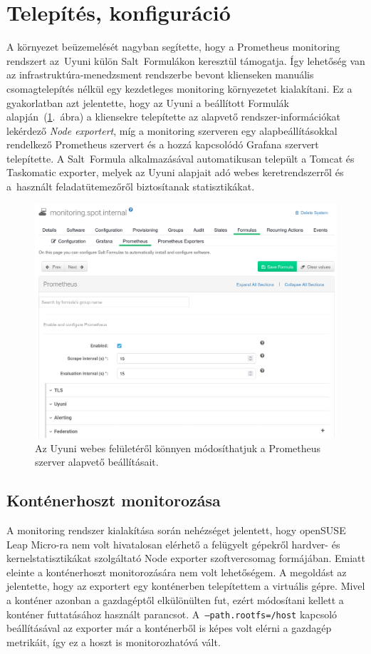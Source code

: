 \section{Telepítés, konfiguráció}
\label{sect:monitoring-installation}
A környezet beüzemelését nagyban segítette, hogy a Prometheus monitoring rendszert az~Uyuni külön Salt~Formulákon keresztül támogatja. Így lehetőség van az infrastruktúra-menedzsment rendszerbe bevont klienseken manuális csomagtelepítés nélkül egy kezdetleges monitoring környezetet kialakítani. Ez a gyakorlatban azt jelentette, hogy az Uyuni a beállított Formulák alapján~(\ref{fig:prometheus-formula}.~ábra) a kliensekre telepítette az alapvető rendszer-információkat lekérdező \textit{Node exportert}, míg a monitoring szerveren egy alapbeállításokkal rendelkező Prometheus szervert és a hozzá kapcsolódó Grafana szervert telepítette. A Salt~Formula alkalmazásával automatikusan települt a Tomcat és Taskomatic exporter, melyek az Uyuni alapjait adó webes keretrendszerről és a~használt feladatütemezőről biztosítanak statisztikákat.

\begin{figure}[ht]
	\centering
	\includegraphics[width=15cm]{figures/prometheus-formula.png}
	\caption{Az Uyuni webes felületéről könnyen módosíthatjuk a Prometheus szerver alapvető beállításait.}
	\label{fig:prometheus-formula}
\end{figure}

\subsection{Konténerhoszt monitorozása}
A monitoring rendszer kialakítása során nehézséget jelentett, hogy openSUSE Leap Micro-ra nem volt hivatalosan elérhető a felügyelt gépekről hardver- és kernelstatisztikákat szolgáltató Node exporter szoftvercsomag formájában. Emiatt eleinte a konténerhoszt monitorozására nem volt lehetőségem. A megoldást az jelentette, hogy az exportert egy konténerben telepítettem a virtuális gépre. Mivel a konténer azonban a gazdagéptől elkülönülten fut, ezért módosítani kellett a konténer futtatásához használt parancsot. A~\texttt{--path.rootfs=/host} kapcsoló beállításával az exporter már a konténerből is képes volt elérni a gazdagép metrikáit, így ez a hoszt is monitorozhatóvá vált.

